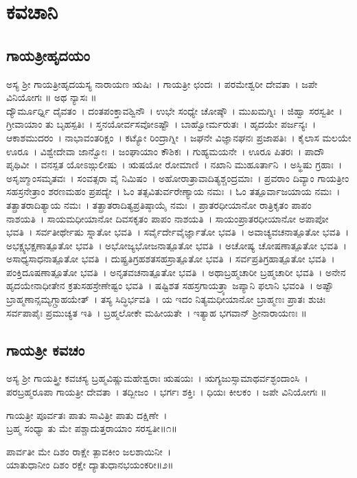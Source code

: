 \chapter*{\center ಕವಚಾನಿ}
\section{ಗಾಯತ್ರೀಹೃದಯಂ }
\thispagestyle{empty}
ಅಸ್ಯ ಶ್ರೀ ಗಾಯತ್ರೀಹೃದಯಸ್ಯ ನಾರಾಯಣ ಋಷಿಃ~। ಗಾಯತ್ರೀ ಛಂದಃ~। ಪರಮೇಶ್ವರೀ ದೇವತಾ~। ಜಪೇ ವಿನಿಯೋಗಃ ॥ ಅಥ ನ್ಯಾಸಃ ॥\\
ದ್ಯೌರ್ಮೂರ್ಧ್ನಿ ದೈವತಂ~। ದಂತಪಂಕ್ತಾವಶ್ವಿನೌ~। ಉಭೇ ಸಂಧ್ಯೇ ಚೋಷ್ಠೌ~। ಮುಖಮಗ್ನಿಃ~। ಜಿಹ್ವಾ ಸರಸ್ವತೀ~। ಗ್ರೀವಾಯಾಂ ತು ಬೃಹಸ್ಪತಿಃ~। ಸ್ತನಯೋರ್ವಸವೋಽಷ್ಟೌ~। ಬಾಹ್ವೋರ್ಮರುತಃ~। ಹೃದಯೇ ಪರ್ಜನ್ಯಃ~। ಆಕಾಶಮುದರಂ~। ನಾಭಾವಂತರಿಕ್ಷಂ~। ಕಟ್ಯೋ ರಿಂದ್ರಾಗ್ನೀ~। ಜಘನೇ ವಿಜ್ಞಾನಘನಃ ಪ್ರಜಾಪತಿಃ~। ಕೈಲಾಸ ಮಲಯೇ ಊರೂ~। ವಿಶ್ವೇದೇವಾ ಜಾನ್ವೋಃ~। ಜಂಘಾಯಾಂ ಕೌಶಿಕಃ~। ಗುಹ್ಯಮಯನೇ~। ಊರೂ ಪಿತರಃ~। ಪಾದೌ ಪೃಥಿವೀ~। ವನಸ್ಪತ ಯೋಽಙ್ಗುಲೀಷು~। ಋಷಯೋ ರೋಮಾಣಿ~। ನಖಾನಿ ಮುಹೂರ್ತಾನಿ~। ಅಸ್ಥಿಷು ಗ್ರಹಾಃ~। ಅಸೃಙ್ಮಾಂಸಮೃತವಃ~। ಸಂವತ್ಸರಾ ವೈ ನಿಮಿಷಂ~। ಅಹೋರಾತ್ರಾವಾದಿತ್ಯಶ್ಚಂದ್ರಮಾಃ~। ಪ್ರವರಾಂ ದಿವ್ಯಾಂ ಗಾಯತ್ರೀಂ ಸಹಸ್ರನೇತ್ರಾಂ ಶರಣಮಹಂ ಪ್ರಪದ್ಯೇ~। ಓಂ ತತ್ಸವಿತುರ್ವರೇಣ್ಯಾಯ ನಮಃ~। ಓಂ ತತ್ಪೂರ್ವಾಜಯಾಯ ನಮಃ~। ತತ್ಪ್ರಾತರಾದಿತ್ಯಾಯ ನಮಃ~। ತತ್ಪ್ರಾತರಾದಿತ್ಯಪ್ರತಿಷ್ಠಾಯೈ ನಮಃ~। ಪ್ರಾತರಧೀಯಾನೋ ರಾತ್ರಿಕೃತಂ ಪಾಪಂ ನಾಶಯತಿ~। ಸಾಯಮಧೀಯಾನೋ ದಿವಸಕೃತಂ ಪಾಪಂ ನಾಶಯತಿ~। ಸಾಯಂಪ್ರಾತರಧೀಯಾನೋ ಅಪಾಪೋ ಭವತಿ~। ಸರ್ವತೀರ್ಥೇಷು ಸ್ನಾತೋ ಭವತಿ~। ಸರ್ವೈರ್ದೇವೈರ್ಜ್ಞಾತೋ ಭವತಿ~। ಅವಾಚ್ಯವಚನಾತ್ಪೂತೋ ಭವತಿ~। ಅಭಕ್ಷ್ಯಭಕ್ಷಣಾತ್ಪೂತೋ ಭವತಿ~। ಅಭೋಜ್ಯಭೋಜನಾತ್ಪೂತೋ ಭವತಿ~। ಅಚೋಷ್ಯ ಚೋಷಣಾತ್ಪೂತೋ ಭವತಿ~। ಅಸಾಧ್ಯಸಾಧನಾತ್ಪೂತೋ ಭವತಿ~। ದುಷ್ಪ್ರತಿಗ್ರಹಶತಸಹಸ್ರಾತ್ಪೂತೋ ಭವತಿ~। ಸರ್ವಪ್ರತಿಗ್ರಹಾತ್ಪೂತೋ ಭವತಿ~। ಪಂಕ್ತಿದೂಷಣಾತ್ಪೂತೋ ಭವತಿ~। ಅನೃತವಚನಾತ್ಪೂತೋ ಭವತಿ~। ಅಥಾಬ್ರಹ್ಮಚಾರೀ ಬ್ರಹ್ಮಚಾರೀ ಭವತಿ~। ಅನೇನ ಹೃದಯೇನಾಧೀತೇನ ಕ್ರತುಸಹಸ್ರೇಣೇಷ್ಟಂ ಭವತಿ~। ಷಷ್ಟಿಶತ ಸಹಸ್ರಗಾಯತ್ರ್ಯಾ ಜಪ್ಯಾನಿ ಫಲಾನಿ ಭವಂತಿ~। ಅಷ್ಟೌ ಬ್ರಾಹ್ಮಣಾನ್ಸಮ್ಯಗ್ಗ್ರಾಹಯೇತ್~। ತಸ್ಯ ಸಿದ್ಧಿರ್ಭವತಿ~। ಯ ಇದಂ ನಿತ್ಯಮಧೀಯಾನೋ ಬ್ರಾಹ್ಮಣಃ ಪ್ರಾತಃ ಶುಚಿಃ ಸರ್ವಪಾಪೈಃ ಪ್ರಮುಚ್ಯತ ಇತಿ~। ಬ್ರಹ್ಮಲೋಕೇ ಮಹೀಯತೇ~। ಇತ್ಯಾಹ ಭಗವಾನ್ ಶ್ರೀನಾರಾಯಣಃ ॥\\
\section{ಗಾಯತ್ರೀ ಕವಚಂ}
ಅಸ್ಯ ಶ್ರೀ ಗಾಯತ್ತ್ರೀ ಕವಚಸ್ಯ ಬ್ರಹ್ಮವಿಷ್ಣುಮಹೇಶ್ವರಾಃ ಋಷಯಃ~। ಋಗ್ಯಜುಸ್ಸಾಮಾಥರ್ವಶ್ಛಂದಾಂಸಿ~। ಪರಬ್ರಹ್ಮರೂಪಾ ಗಾಯತ್ರೀ ದೇವತಾ~। ತದ್ಬೀಜಂ~। ಭರ್ಗಃ ಶಕ್ತಿಃ~। ಧಿಯಃ ಕೀಲಕಂ~। ಜಪೇ ವಿನಿಯೋಗಃ ॥

ಗಾಯತ್ರೀ ಪೂರ್ವತಃ ಪಾತು ಸಾವಿತ್ರೀ ಪಾತು ದಕ್ಷಿಣೇ~।\\
ಬ್ರಹ್ಮ ಸಂಧ್ಯಾ ತು ಮೇ ಪಶ್ಚಾದುತ್ತರಾಯಾಂ ಸರಸ್ವತೀ॥೧॥

ಪಾರ್ವತೀ ಮೇ ದಿಶಂ ರಾಕ್ಷೇ ತ್ಪಾವಕೀಂ ಜಲಶಾಯಿನೀ~।\\
ಯಾತುಧಾನೀಂ ದಿಶಂ ರಕ್ಷೇ ದ್ಯಾತುಧಾನಭಯಂಕರೀ॥೨॥

